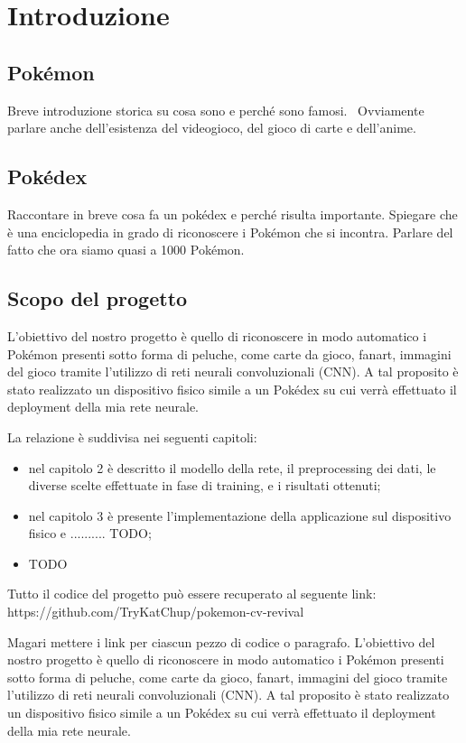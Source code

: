 \chapter{Introduzione}
\label{ch:Introduction}
\section{Pokémon}

Breve introduzione storica su cosa sono e perché sono famosi.~\cite{bijeeta}
Ovviamente parlare anche dell'esistenza del videogioco, del gioco di carte e dell'anime.

\section{Pokédex}
Raccontare in breve cosa fa un pokédex e perché risulta importante.
Spiegare che è una enciclopedia in grado di riconoscere i Pokémon che si incontra. Parlare del fatto che ora siamo quasi a 1000 Pokémon.

\section{Scopo del progetto}

L'obiettivo del nostro progetto è quello di riconoscere in modo automatico i Pokémon presenti sotto forma di peluche, come carte da gioco, fanart, immagini del gioco tramite l'utilizzo di reti neurali convoluzionali (CNN). A tal proposito è stato realizzato un dispositivo fisico simile
a un Pokédex su cui verrà effettuato il deployment della mia rete neurale.

La relazione è suddivisa nei seguenti capitoli:
\begin{itemize}
  \item nel capitolo 2 è descritto il modello della rete, il preprocessing dei dati, le diverse scelte effettuate in fase di training, e i risultati ottenuti;
  \item nel capitolo 3 è presente l'implementazione della applicazione sul dispositivo fisico e .......... TODO;
  \item TODO
\end{itemize}

Tutto il codice del progetto può essere recuperato al seguente link: 
\\
https://github.com/TryKatChup/pokemon-cv-revival

Magari mettere i link per ciascun pezzo di codice o paragrafo.
\newline
L'obiettivo del nostro progetto è quello di riconoscere in modo automatico i Pokémon presenti sotto forma di peluche, come carte da gioco, fanart, immagini del gioco tramite l'utilizzo di reti neurali convoluzionali (CNN). A tal proposito è stato realizzato un dispositivo fisico simile
a un Pokédex su cui verrà effettuato il deployment della mia rete neurale.

